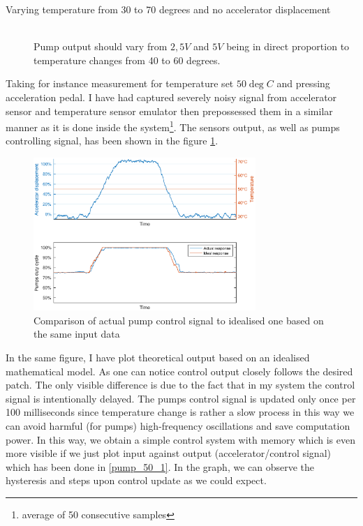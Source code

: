 \begin{description}
    \item[Varying temperature from 30 to 70 degrees and no accelerator displacement] \hfill \\ Pump output should vary from $2,5V$ and $5V$ being in direct proportion to temperature changes from 40 to 60 degrees.
\end{description}

Taking for instance measurement for temperature set $50\deg C$ and pressing acceleration pedal. I have had captured severely noisy signal from accelerator sensor and temperature sensor emulator then prepossessed them in a similar manner as it is done inside the system\footnote{average of 50 consecutive samples}. The sensors output, as well as pumps controlling signal, has been shown in the figure \ref{pump_50}.

\begin{figure}[h]
    \centering
    \includegraphics[height=5.8cm]{figures/pump_50.eps}
    \caption[Temperature set to 50\textdegree C and varying accelerator displacement]{Comparison of actual pump control signal to idealised one based on the same input data}
    \label{pump_50}
\end{figure}

In the same figure, I have plot theoretical output based on an idealised mathematical model. As one can notice control output closely follows the desired patch. The only visible difference is due to the fact that in my system the control signal is intentionally delayed.
The pumps control signal is updated only once per 100 milliseconds since temperature change is rather a slow process in this way we can avoid harmful (for pumps) high-frequency oscillations and save computation power. In this way, we obtain a simple control system with memory which is even more visible if we just plot input against output (accelerator/control signal) which has been done in \ref{pump_50_1}. In the graph, we can observe the hysteresis and steps upon control update as we could expect.


